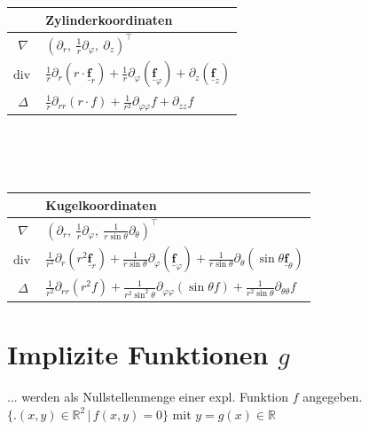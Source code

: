 \documentclass[6pt,a4paper]{scrartcl}
\newcommand{\iset}[2]{\ensuremath{\bigl\{ \bigl. #1 \, \bigr| \, #2 \bigr\}}}					%
\renewcommand{\vec}[1]{\ensuremath{\underline{\boldsymbol {#1}}}}								%
\renewcommand{\div}{\ensuremath{\mathrm{div}\ }}								%
\begin{document}
\begin{multicols}{4}
\begin{tabular}{c|l} 
 & Zylinderkoordinaten \\ \midrule
 $\nabla$ & $(\partial_r,\ \frac{1}{r}\partial_\varphi,\ \partial_z)^\top$ \\ \midrule
 $\div$ & $\frac{1}{r} \partial_r(r\cdot \vec f_r) + \frac{1}{r} \partial_\varphi(\vec f_\varphi) + \partial_z(\vec f_z)$ \\ \midrule
$ \Delta$ & $\frac{1}{r} \partial_{rr}(r\cdot f) + \frac{1}{r^2} \partial_{\varphi\varphi}f + \partial_{zz}f$
\end{tabular}
\\ \\ \\
\begin{tabular}{c|l} 
 & Kugelkoordinaten \\ \midrule

$\nabla$ & $(\partial_r,\ \frac{1}{r}\partial_\varphi,\ \frac{1}{r\sin\theta}\partial_\theta)^\top$\\ \midrule
$\div$ & $  \frac{1}{r^{2}}  \partial_r(r^2 \vec f_r) + \frac{1}{r \sin \theta} \partial_\varphi(\vec f_\varphi) + \frac{1}{r \sin \theta} \partial_\theta(\sin \theta \vec f_\theta)$\\ \midrule
$\Delta $ & $ \frac{1}{r^{2}} \partial_{rr}(r^2 f) + \frac{1}{r^2\sin^2\theta} \partial_{\varphi\varphi} (\sin\theta f) + \frac{1}{r^2\sin\theta} \partial_{\theta\theta} f$
\end{tabular}

\section{Implizite Funktionen $g$}
... werden als Nullstellenmenge einer expl. Funktion $f$ angegeben.\\
$\iset{(x,y) \in \mathbb R^2 }{f(x,y) = 0}$ mit $y=g(x) \in \mathbb R$


\end{multicols}
\end{document}
